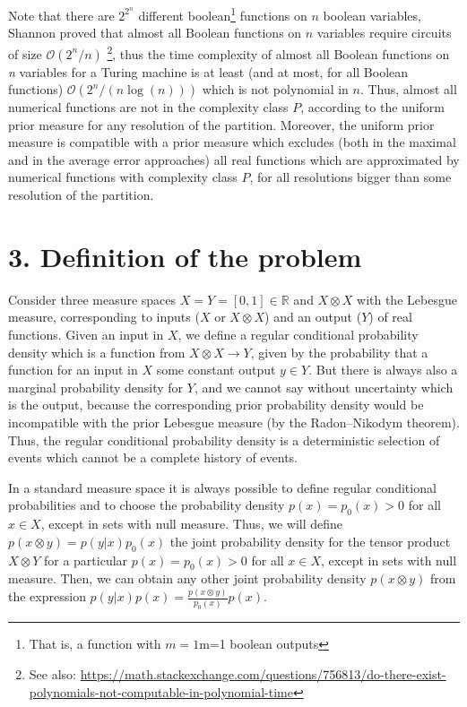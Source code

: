 \documentclass[11pt]{book}
\begin{document}
Note that there are \(2^{2^n}\) different boolean\footnote{That is, a
  function with {{\(m = 1\)}{{{}{m}{}{=}{}}{{}{1}}}} boolean outputs}
functions on \(n\) boolean variables, Shannon proved that almost all
Boolean functions on \(n\) variables require circuits of size
\(\mathcal{O}(2^n/n)\)
\cite{shannon1949synthesis}\footnote{See
  also:
  \url{https://math.stackexchange.com/questions/756813/do-there-exist-polynomials-not-computable-in-polynomial-time}},
thus the time complexity of almost all Boolean functions on \emph{n}
variables for a Turing machine is at least (and at most, for all Boolean
functions)
\(\mathcal{O}(2^n/(n\log(n)))\)\cite{10.1145ux2f322123.322138} which is not polynomial in \(n\). Thus, almost all
numerical functions are not in the complexity class \(P\), according to
the uniform prior measure for any resolution of the partition. Moreover,
the uniform prior measure is compatible with a prior measure which
excludes (both in the maximal and in the average error approaches) all
real functions which are approximated by numerical functions with
complexity class \(P\), for all resolutions bigger than some resolution
of the partition.

\hypertarget{definition-of-the-problem}{%
\section{3. Definition of the problem}\label{definition-of-the-problem}}

Consider three measure spaces \(X=Y=[0,1]\in \mathbb{R}\) and
\(X\otimes X\) with the Lebesgue measure, corresponding to inputs (\(X\)
or \(X\otimes X\)) and an output (\(Y\)) of real functions. Given an
input in \(X\), we define a regular conditional probability density
which is a function from \(X\otimes X\to Y\), given by the probability
that a function for an input in \(X\) some constant output \(y\in Y\).
But there is always also a marginal probability density for \(Y\), and
we cannot say without uncertainty which is the output, because the
corresponding prior probability density would be incompatible with the
prior Lebesgue measure (by the Radon--Nikodym theorem). Thus, the
regular conditional probability density is a deterministic selection of
events which cannot be a complete history of events.

In a standard measure space it is always possible to define regular
conditional
probabilities\cite{durrett2019probability} and to choose the probability density \(p(x)=p_0(x)>0\) for all
\(x\in X\), except in sets with null measure. Thus, we will define
\(p(x\otimes y)=p(y|x)p_0(x)\) the joint probability density for the
tensor product \(X\otimes Y\) for a particular \(p(x)=p_0(x)>0\) for all
\(x\in X\), except in sets with null measure. Then, we can obtain any
other joint probability density \(p(x\otimes y)\) from the expression
\(p(y|x)p(x)=\frac{p(x\otimes y)}{p_0(x)}p(x)\).
\end{document}
